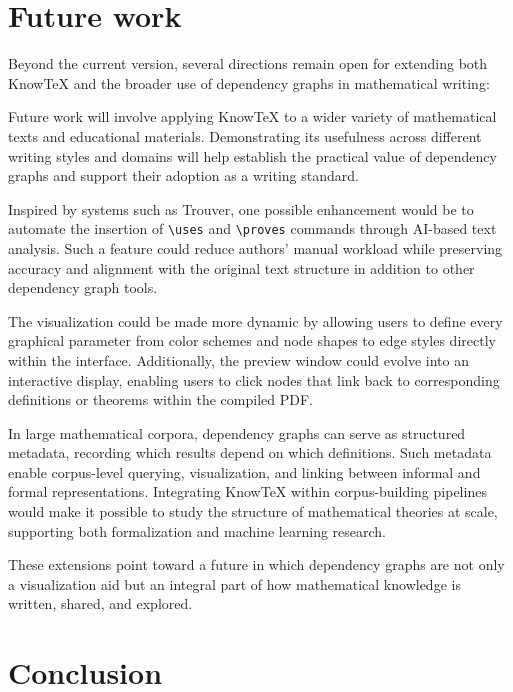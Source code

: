 \documentclass{article}
\begin{document}
\section{Future work}
Beyond the current version, several directions
remain open for extending both KnowTeX and the
broader use of dependency graphs in mathematical
writing:

 Future work will involve applying KnowTeX to a wider variety of mathematical texts and educational materials. Demonstrating its usefulness across different writing styles and domains will help establish the practical value
of dependency graphs and support their adoption
as a writing standard.

 Inspired by systems such as Trouver, one possible enhancement would be to automate the insertion of {\verb|\uses|}
and {\verb|\proves|} commands through AI-based text
analysis. Such a feature could reduce authors’
manual workload while preserving accuracy and
alignment with the original text structure in addition
to other dependency graph tools.

 The visualization could be made more dynamic by allowing users to define every graphical parameter from color schemes and node shapes to edge styles directly within the interface. Additionally,
the preview window could evolve into an interactive
display, enabling users to click nodes that link back
to corresponding definitions or theorems within the
compiled PDF.

 In large mathematical corpora, dependency graphs can serve as structured metadata, recording which results depend on which definitions. Such metadata enable corpus-level querying, visualization, and linking between informal and formal representations. 
Integrating KnowTeX within corpus-building pipelines would make it possible to study the structure of mathematical theories at scale, supporting both formalization and machine learning research.

These extensions point toward a future in which dependency graphs are not only a visualization aid but an integral part of how mathematical knowledge is written, shared, and explored.

\section{Conclusion}
\end{document}
